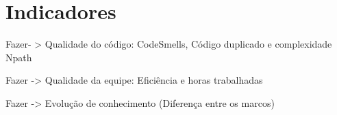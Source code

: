 \chapter{Indicadores}

Fazer- > Qualidade do código: CodeSmells, Código duplicado e complexidade Npath

Fazer ->  Qualidade da equipe: Eficiência e horas trabalhadas

Fazer -> Evolução de conhecimento (Diferença entre os marcos)